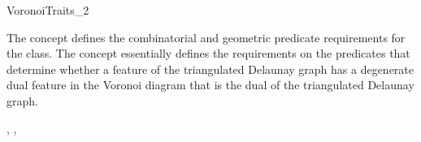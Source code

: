 


\begin{ccRefConcept}{VoronoiTraits_2}

\ccDefinition

The concept  defines the combinatorial and
geometric predicate requirements for the
 class. The
 concept essentially defines the requirements on
the predicates that determine whether a feature of the triangulated
Delaunay graph has a degenerate dual feature in the Voronoi diagram
that is the dual of the triangulated Delaunay graph.

\ccRefines
{}, , 


\end{ccRefConcept}
